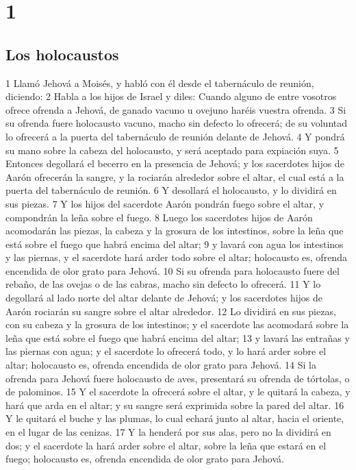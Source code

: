 

\chapter{1}

\section{Los holocaustos}

1 Llamó Jehová a Moisés, y habló con él desde el tabernáculo de reunión, diciendo:
2 Habla a los hijos de Israel y diles: Cuando alguno de entre vosotros ofrece ofrenda a Jehová, de ganado vacuno u ovejuno haréis vuestra ofrenda.
3 Si su ofrenda fuere holocausto vacuno, macho sin defecto lo ofrecerá; de su voluntad lo ofrecerá a la puerta del tabernáculo de reunión delante de Jehová.
4 Y pondrá su mano sobre la cabeza del holocausto, y será aceptado para expiación suya.
5 Entonces degollará el becerro en la presencia de Jehová; y los sacerdotes hijos de Aarón ofrecerán la sangre, y la rociarán alrededor sobre el altar, el cual está a la puerta del tabernáculo de reunión.
6 Y desollará el holocausto, y lo dividirá en sus piezas.
7 Y los hijos del sacerdote Aarón pondrán fuego sobre el altar, y compondrán la leña sobre el fuego.
8 Luego los sacerdotes hijos de Aarón acomodarán las piezas, la cabeza y la grosura de los intestinos, sobre la leña que está sobre el fuego que habrá encima del altar;
9 y lavará con agua los intestinos y las piernas, y el sacerdote hará arder todo sobre el altar; holocausto es, ofrenda encendida de olor grato para Jehová.
10 Si su ofrenda para holocausto fuere del rebaño, de las ovejas o de las cabras, macho sin defecto lo ofrecerá.
11 Y lo degollará al lado norte del altar delante de Jehová; y los sacerdotes hijos de Aarón rociarán su sangre sobre el altar alrededor.
12 Lo dividirá en sus piezas, con su cabeza y la grosura de los intestinos; y el sacerdote las acomodará sobre la leña que está sobre el fuego que habrá encima del altar;
13 y lavará las entrañas y las piernas con agua; y el sacerdote lo ofrecerá todo, y lo hará arder sobre el altar; holocausto es, ofrenda encendida de olor grato para Jehová.
14 Si la ofrenda para Jehová fuere holocausto de aves, presentará su ofrenda de tórtolas, o de palominos.
15 Y el sacerdote la ofrecerá sobre el altar, y le quitará la cabeza, y hará que arda en el altar; y su sangre será exprimida sobre la pared del altar.
16 Y le quitará el buche y las plumas, lo cual echará junto al altar, hacia el oriente, en el lugar de las cenizas.
17 Y la henderá por sus alas, pero no la dividirá en dos; y el sacerdote la hará arder sobre el altar, sobre la leña que estará en el fuego; holocausto es, ofrenda encendida de olor grato para Jehová.  

